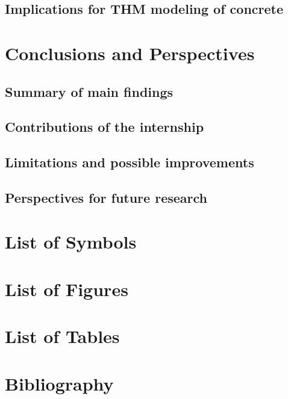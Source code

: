 \documentclass[twoside]{report}
\begin{document}
\section{Implications for THM modeling of concrete}




\cleardoublepage
\chapter{Conclusions and Perspectives}

\section{Summary of main findings}
\section{Contributions of the internship}
\section{Limitations and possible improvements}
\section{Perspectives for future research}




\cleardoublepage
\chapter*{List of Symbols}

\newpage
\chapter*{List of Figures}
\listoffigures

\newpage
\chapter*{List of Tables}
\listoftables

\newpage
\chapter*{Bibliography}
\end{document}
